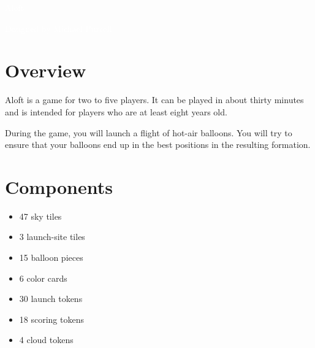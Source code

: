 \documentclass[a6paper, 11pt, parskip=half, DIV=15]{scrartcl}
\begin{document}
\begin{titlepage}

\enlargethispage{3.0\baselineskip}
\Huge
\vspace*{-1.0\baselineskip}
{
\setmainfont[Scale=2.2375]{Oi}
\begin{center}
\textcolor{white}{Aloft}
\end{center}
}
\vfill
\huge
\setmainfont[Scale=1.05]{Playball}
\begin{center}
\textcolor{white}{Designed by Michael Purcell}
\end{center}
\end{titlepage}


\ClearShipoutPicture
\enlargethispage{1.75\baselineskip}
\section*{Overview}
Aloft is a game for two to five players. It can be played in about thirty minutes and is intended for players who are at least eight years old.

During the game, you will launch a flight of hot-air balloons. You will try to ensure that your balloons end up in the best positions in the resulting formation.

\section*{Components}
\begin{itemize}[nosep]
  \item 47 sky tiles
  \item 3 launch-site tiles
  \item 15 balloon pieces
  \item 6 color cards
  \item 30 launch tokens
  \item 18 scoring tokens
  \item 4 cloud tokens
\end{itemize}

\newpage
\enlargethispage{1.75\baselineskip}
\end{document}
